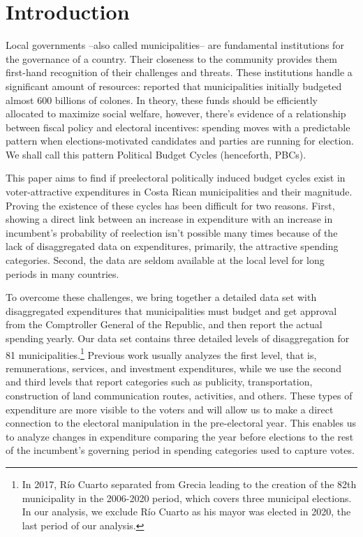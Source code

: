 \newpage
\setcounter{page}{1}

\section{Introduction}\label{sec:intro}

Local governments --also called municipalities-- are fundamental institutions for the governance of a country. Their closeness to the community provides them first-hand recognition of their challenges and threats. These institutions handle a significant amount of resources: \textcite{cgr2020} reported that municipalities initially budgeted almost 600 billions of colones. In theory, these funds should be efficiently allocated to maximize social welfare, however, there's evidence of a relationship between fiscal policy and electoral incentives:  spending moves with a predictable pattern when elections-motivated candidates and parties are running for election. We shall call this pattern Political Budget Cycles (henceforth, PBCs). \parencite{chortareas2016,drazen2010}

This paper aims to find if preelectoral politically induced budget cycles exist in voter-attractive expenditures in Costa Rican municipalities and their magnitude. Proving the existence of these cycles has been difficult for two reasons. First, showing a direct link between an increase in expenditure with an increase in incumbent's probability of reelection isn't possible many times because of the lack of disaggregated data on expenditures, primarily, the attractive spending categories. Second, the data are seldom available at the local level for long periods in many countries. 

To overcome these challenges, we bring together a detailed data set with disaggregated expenditures that municipalities must budget and get approval from the Comptroller General of the Republic, and then report the actual spending yearly. Our data set contains three detailed levels of disaggregation for 81 municipalities.\footnote{In 2017, Río Cuarto separated from Grecia leading to the creation of the 82th municipality in the 2006-2020 period, which covers three municipal elections. In our analysis, we exclude Río Cuarto as his mayor was elected in 2020, the last period of our analysis. }  Previous work usually analyzes the first level, that is, remunerations, services, and investment expenditures, while we use the second and third levels that report categories such as publicity, transportation, construction of land communication routes, activities, and others. These types of expenditure are more visible to the voters and will allow us to make a direct connection to the electoral manipulation in the pre-electoral year. This enables us to analyze changes in expenditure comparing the year before elections to the rest of the incumbent's governing period in spending categories used to capture votes. 

